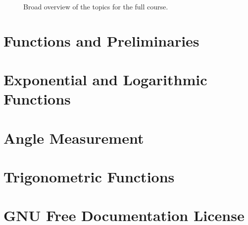 \documentclass[12pt,twoside,letterpaper]{book}
\begin{document}
\begin{figure}[!h]
{\begin{tikzpicture}[mindmap,
        level 1 concept/.append style={level distance=130,sibling angle=120},
        ]


        \end{tikzpicture}
      }
      \caption{Broad overview of the topics for the full course.}
\end{figure}


\chapter{Functions and Preliminaries}





\chapter{Exponential and Logarithmic Functions}



\chapter{Angle Measurement}



\chapter{Trigonometric Functions}



\chapter{GNU Free Documentation License}

\end{document}
